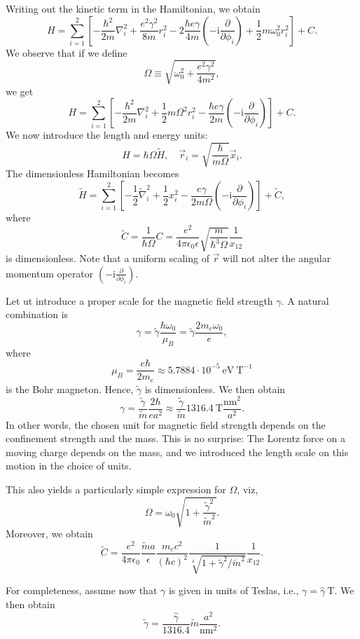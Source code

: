 \documentclass{article}
\begin{document}
\newcommand{\LZ}{\left(-\mathrm{i}\frac{\partial}{\partial \phi_i}\right)}
Writing out the kinetic term in the Hamiltonian, we obtain
\[ H = \sum_{i=1}^2 \left[-\frac{\hbar^2}{2m}\nabla_i^2 +
  \frac{e^2\gamma^2}{8m}r_i^2 - 2\frac{\hbar e\gamma}{4m}\LZ +
  \frac{1}{2}m\omega_0^2r_i^2 \right] + C. \]
We observe that if we define
\[ \Omega \equiv \sqrt{\omega_0^2 + \frac{e^2\gamma^2}{4m^2}}, \]
we get
\[ H = \sum_{i=1}^2 \left[-\frac{\hbar^2}{2m}\nabla_i^2 +
  \frac{1}{2}m\Omega^2 r_i^2 - \frac{\hbar e\gamma}{2m}\LZ 
   \right] + C. \]
We now introduce the length and energy units:
\[ H = \hbar\Omega\tilde{H}, \quad \vec{r}_i =
   \sqrt{\frac{\hbar}{m\Omega}}\vec{x}_i. \]
The dimensionless Hamiltonian becomes
\[ \tilde{H} = \sum_{i=1}^2 \left[-\frac{1}{2}\tilde{\nabla}_i^2 +
  \frac{1}{2} x_i^2 - \frac{e\gamma}{2m\Omega}\LZ 
   \right] + \tilde{C},\]
where
\[ \tilde{C} = \frac{1}{\hbar\Omega}C  =
   \frac{e^2}{4\pi\epsilon_0\epsilon}\sqrt{\frac{m}{\hbar^3\Omega}}\frac{1}{x_{12}}
   \]
is dimensionless. Note that a uniform scaling of $\vec{r}$ will not
alter the angular momentum operator $\LZ$.

Let ut introduce a proper scale for the magnetic field strength
$\gamma$. A natural combination is
\[ \gamma = \tilde{\gamma}\frac{\hbar\omega_0}{\mu_B} =
\tilde{\gamma}\frac{2m_e\omega_0}{e}, \]
where 
\[ \mu_B = \frac{e\hbar}{2m_e} \approx
5.7884\cdot10^{-5}\:\mathrm{eV\:T^{-1}} \]
is the Bohr magneton. Hence, $\tilde{\gamma}$ is dimensionless. We then obtain
\[ \gamma = \frac{\tilde{\gamma}}{\tilde{m}} \frac{2\hbar}{ea^2}
\approx \frac{\tilde{\gamma}}{\tilde{m}} 1316.4 \: \mathrm{T}
\frac{\mathrm{nm}^2}{a^2}. \]
In other words, the chosen unit for magnetic field strength depends on
the confinement strength and the mass. This is no surprise: The
Lorentz force on a moving charge depends on the mass, and we
introduced the length scale on this motion in the choice of units.

This also yields a particularly simple expression for $\Omega$, viz,
\[ \Omega = \omega_0 \sqrt{1 +
  \frac{\tilde{\gamma}^2}{\tilde{m}^2}}. \]
Moreover, we obtain
\[ \tilde{C} = \frac{e^2}{4\pi\epsilon_0}\frac{\tilde{m}a}{\epsilon}
\frac{m_ec^2}{(\hbar c)^2}
\frac{1}{\sqrt[4]{1+\tilde{\gamma}^2/\tilde{m}^2}}\frac{1}{x_{12}}. \]

For completeness, assume now that $\gamma$ is given in units of Teslas, i.e., $\gamma =
\hat{\gamma}\:\mathrm{T}$. We then obtain
\[ \tilde{\gamma} = \frac{\hat{\gamma}}{1316.4} \tilde{m}
\frac{a^2}{\textrm{nm}^2}. \]
\end{document}
